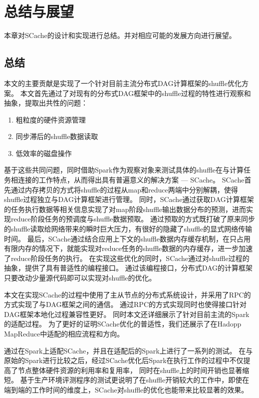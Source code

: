 
\chapter{总结与展望}
\label{chap:summary}

本章对SCache的设计和实现进行总结。并对相应可能的发展方向进行展望。

\section{总结}

本文的主要贡献是实现了一个针对目前主流分布式DAG计算框架的shuffle优化方案。
本文首先通过了对现有的分布式DAG框架中的shuffle过程的特性进行观察和抽象，提取出共性的问题：
\begin{enumerate}
    \item 粗粒度的硬件资源管理
    \item 同步滞后的shuffle数据读取
    \item 低效率的磁盘操作
\end{enumerate}
基于这些共同问题，同时借助Spark作为观察对象来测试具体的shuffle在与计算任务相连接的工作特点，从而得出具有普遍意义的解决方案 --- SCache。
SCache首先通过内存拷贝的方式将shuffle的过程从map和reduce两端中分别解耦，使得shuffle过程独立与DAG计算框架进行管理。
同时，SCache通过获取DAG计算框架的任务执行数据等相关信息实现了对map阶段shuffle输出数据分布的预测，进而实现reduce阶段任务的预调度与shuffle数据预取。
通过预取的方式既打破了原来同步的shuffle读取给网络带来的瞬时巨大压力，有很好的隐藏了shuffle的显式网络传输时间。
最后，SCache通过结合应用上下文的shuffle数据内存缓存机制，在只占用有限内存的情况下，就能实现对reduce任务的shuffle数据的内存缓存，进一步加速了reduce阶段任务的执行。
在实现这些优化的同时，SCache通过对shuffle过程的抽象，提供了具有普适性的编程接口。
通过该编程接口，分布式DAG的计算框架只要改动少量源代码即可以实现对shuffle的优化。

本文在实现SCache的过程中使用了主从节点的分布式系统设计，并采用了RPC的方式实现了与DAG框架之间的通信。
通过RPC的方式实现同时也使得接口针对DAG框架本地化过程兼容性更好。
同时本文还详细展示了针对目前主流的Spark的适配过程。
为了更好的证明SCache优化的普适性，我们还展示了在Hadopp MapReduce中适配的相应流程和方向。

通过在Spark上适配SCache，并且在适配后的Spark上进行了一系列的测试。
在与原始的Spark进行比较之后，经过SCache优化后Spark在执行工作的过程中不仅提高了节点整体硬件资源的利用率和复用率，
同时在shuffle上的时间开销也显著缩短。
基于生产环境评测程序的测试更说明了在shuffle开销较大的工作中，即使在端到端的工作时间的维度上，SCache对shuffle的优化也能带来比较显著的效果。

